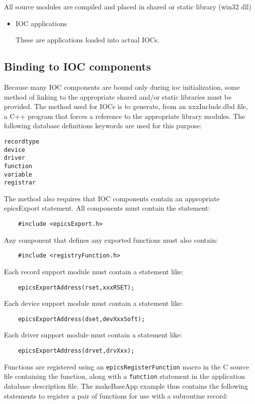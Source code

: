All source modules are compiled and placed in shared or static library (win32 dll)

\begin{itemize}\item IOC applications

These are applications loaded into actual IOCs.

\end{itemize}\subsection{Binding to IOC components}

Because many IOC components are bound only during ioc initialization, some method of linking to the appropriate shared 
and/or static libraries must be provided. The method used for IOCs is to generate, from an xxxInclude.dbd file, a C++ 
program that forces a reference to the appropriate library modules. The following database definitions keywords are used 
for this purpose:

\begin{verbatim}recordtype
device
driver
function
variable
registrar
\end{verbatim}The method also requires that IOC components contain an appropriate epicsExport statement. All components must 
contain the statement:

\begin{verbatim}    #include <epicsExport.h>
\end{verbatim}Any component that defines any exported functions must also contain:

\begin{verbatim}    #include <registryFunction.h>
\end{verbatim}Each record support module must contain a statement like:

\begin{verbatim}    epicsExportAddress(rset,xxxRSET);
\end{verbatim}Each device support module must contain a statement like:

\begin{verbatim}    epicsExportAddress(dset,devXxxSoft);
\end{verbatim}Each driver support module must contain a statement like:

\begin{verbatim}    epicsExportAddress(drvet,drvXxx);
\end{verbatim}Functions are registered using an \verb|epicsRegisterFunction| macro in the C source file containing the function, along 
with a \verb|function| statement in the application database description file.  The makeBaseApp example thus contains the 
following statements to register a pair of functions for use with a subroutine record:

